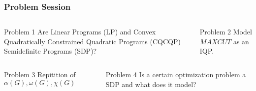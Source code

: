 \documentclass[11pt]{beamer}
\begin{document}
	\begin{frame}
		\frametitle{Problem Session}
		\begin{columns}
			\begin{column}{0.5\textwidth}
				\begin{block}{Problem 1}
					Are Linear Programs (LP) and Convex Quadratically Constrained Quadratic Programs (CQCQP) Semidefinite Programs (SDP)?
				\end{block}
			\end{column}
			\begin{column}{0.5\textwidth}
				\begin{block}{Problem 2}
					Model $MAX CUT$ as an IQP.
				\end{block}
			\end{column}
		\end{columns}
		\begin{columns}
			\begin{column}{0.5\textwidth}
				\begin{block}{Problem 3}
					Repitition of $\alpha(G), \omega(G), \chi(G)$
				\end{block}
			\end{column}
			\begin{column}{0.5\textwidth}
				\begin{block}{Problem 4}
					\vspace{4.4ex} Is a certain optimization problem a SDP and what does it model?\vspace{4.5ex}
				\end{block}
			\end{column}
		\end{columns}
	\end{frame}
\end{document}
